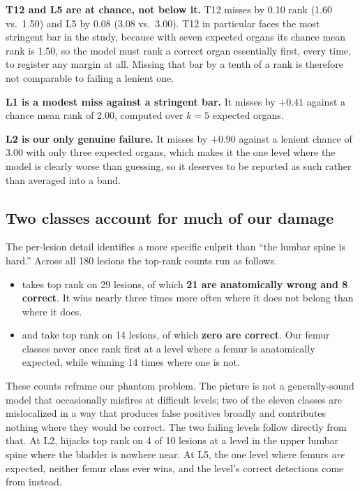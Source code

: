 \textbf{T12 and L5 are at chance, not below it.} T12 misses by 0.10 rank
(1.60 vs.\ 1.50) and L5 by 0.08 (3.08 vs.\ 3.00). T12 in particular faces
the most stringent bar in the study, because with seven expected organs its
chance mean rank is 1.50, so the model must rank a correct organ essentially
first, every time, to register any margin at all. Missing that bar by a tenth of
a rank is therefore not comparable to failing a lenient one.

\textbf{L1 is a modest miss against a stringent bar.} It misses by $+0.41$
against a chance mean rank of 2.00, computed over $k=5$ expected organs.

\textbf{L2 is our only genuine failure.} It misses by $+0.90$ against a lenient
chance of 3.00 with only three expected organs, which makes it the one level
where the model is clearly worse than guessing, so it deserves to be reported as
such rather than averaged into a band.

\subsection{Two classes account for much of our damage}

The per-lesion detail identifies a more specific culprit than ``the lumbar spine
is hard.'' Across all 180 lesions the top-rank counts run as follows.

\begin{itemize}
\item {} takes top rank on 29 lesions, of which \textbf{21 are
      anatomically wrong and 8 correct}. It wins nearly three times more often
      where it does not belong than where it does.
\item {} and  take top rank on 14 lesions, of
      which \textbf{zero are correct}. Our femur classes never once rank first
      at a level where a femur is anatomically expected, while winning 14 times
      where one is not.
\end{itemize}

These counts reframe our phantom problem. The picture is not a generally-sound
model that occasionally misfires at difficult levels; two of the eleven
classes are mislocalized in a way that produces false positives broadly
and contributes nothing where they would be correct. The two failing levels
follow directly from that. At L2,  hijacks top rank on 4 of 10
lesions at a level in the upper lumbar spine where the bladder is nowhere near.
At L5, the one level where femurs \emph{are} expected, neither femur class
ever wins, and the level's correct detections come from 
instead.

